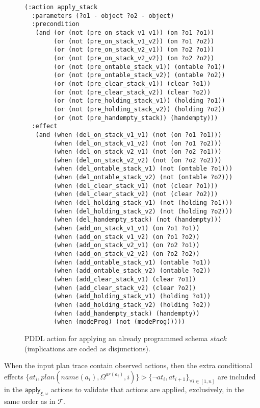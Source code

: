 \begin{itemize}
\begin{enumerate}
\begin{figure}[hbt!]
\begin{scriptsize}
\begin{verbatim}
(:action apply_stack
  :parameters (?o1 - object ?o2 - object)
  :precondition
   (and (or (not (pre_on_stack_v1_v1)) (on ?o1 ?o1))
        (or (not (pre_on_stack_v1_v2)) (on ?o1 ?o2))
        (or (not (pre_on_stack_v2_v1)) (on ?o2 ?o1))
        (or (not (pre_on_stack_v2_v2)) (on ?o2 ?o2))
        (or (not (pre_ontable_stack_v1)) (ontable ?o1))
        (or (not (pre_ontable_stack_v2)) (ontable ?o2))
        (or (not (pre_clear_stack_v1)) (clear ?o1))
        (or (not (pre_clear_stack_v2)) (clear ?o2))
        (or (not (pre_holding_stack_v1)) (holding ?o1))
        (or (not (pre_holding_stack_v2)) (holding ?o2))
        (or (not (pre_handempty_stack)) (handempty)))
  :effect
   (and (when (del_on_stack_v1_v1) (not (on ?o1 ?o1)))
        (when (del_on_stack_v1_v2) (not (on ?o1 ?o2)))
        (when (del_on_stack_v2_v1) (not (on ?o2 ?o1)))
        (when (del_on_stack_v2_v2) (not (on ?o2 ?o2)))
        (when (del_ontable_stack_v1) (not (ontable ?o1)))
        (when (del_ontable_stack_v2) (not (ontable ?o2)))
        (when (del_clear_stack_v1) (not (clear ?o1)))
        (when (del_clear_stack_v2) (not (clear ?o2)))
        (when (del_holding_stack_v1) (not (holding ?o1)))
        (when (del_holding_stack_v2) (not (holding ?o2)))
        (when (del_handempty_stack) (not (handempty)))
        (when (add_on_stack_v1_v1) (on ?o1 ?o1))
        (when (add_on_stack_v1_v2) (on ?o1 ?o2))
        (when (add_on_stack_v2_v1) (on ?o2 ?o1))
        (when (add_on_stack_v2_v2) (on ?o2 ?o2))
        (when (add_ontable_stack_v1) (ontable ?o1))
        (when (add_ontable_stack_v2) (ontable ?o2))
        (when (add_clear_stack_v1) (clear ?o1))
        (when (add_clear_stack_v2) (clear ?o2))
        (when (add_holding_stack_v1) (holding ?o1))
        (when (add_holding_stack_v2) (holding ?o2))
        (when (add_handempty_stack) (handempty))
        (when (modeProg) (not (modeProg)))))
\end{verbatim}
\end{scriptsize}
 \caption{\small PDDL action for applying an already programmed schema $stack$ (implications are coded as disjunctions).}
\label{fig:compilation}
\end{figure}
When the input plan trace contain observed actions, then the extra conditional effects $\{at_{i},plan(name(a_i),\Omega^{ar(a_i)},i)\}\rhd\{\neg at_{i},at_{i+1}\}_{\forall i\in [1,n]}$ are included in the $\mathsf{apply_{\xi,\omega}}$ actions to validate that actions are applied, exclusively, in the same order as in $\mathcal{T}$.\\


\end{enumerate}
\end{itemize}
